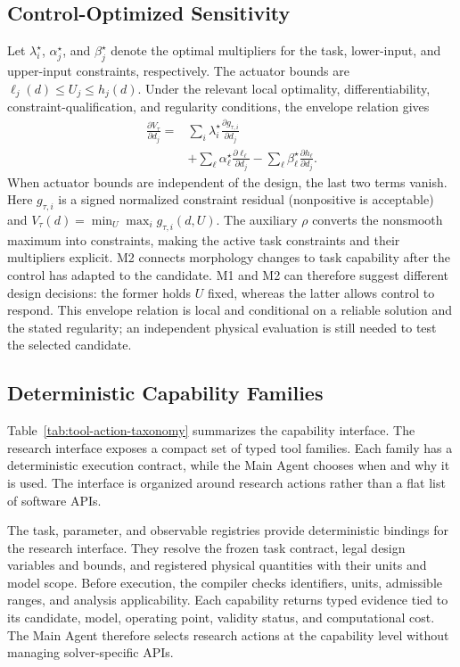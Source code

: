 \subsection{Control-Optimized Sensitivity}
Let $\lambda_i^\star$, $\alpha_j^\star$, and $\beta_j^\star$ denote the optimal multipliers for the task, lower-input, and upper-input constraints, respectively. The actuator bounds are $\ell_j(d)\leq U_j\leq h_j(d)$. Under the relevant local optimality, differentiability, constraint-qualification, and regularity conditions, the envelope relation gives
\begin{equation}
\begin{aligned}
\frac{\partial V_\tau}{\partial d_j}
={}&\sum_i\lambda_i^\star
\frac{\partial g_{\tau,i}}{\partial d_j}\\
&+\sum_\ell\alpha_\ell^\star
\frac{\partial \ell_\ell}{\partial d_j}
-\sum_\ell\beta_\ell^\star
\frac{\partial h_\ell}{\partial d_j}.
\end{aligned}
\label{eq:envelope-general}
\end{equation}
When actuator bounds are independent of the design, the last two terms vanish. Here $g_{\tau,i}$ is a signed normalized constraint residual (nonpositive is acceptable) and $V_\tau(d)=\min_U\max_i g_{\tau,i}(d,U)$. The auxiliary $\rho$ converts the nonsmooth maximum into constraints, making the active task constraints and their multipliers explicit. M2 connects morphology changes to task capability after the control has adapted to the candidate. M1 and M2 can therefore suggest different design decisions: the former holds $U$ fixed, whereas the latter allows control to respond. This envelope relation is local and conditional on a reliable solution and the stated regularity; an independent physical evaluation is still needed to test the selected candidate.


\subsection{Deterministic Capability Families}
\label{subsec:research-tools}

Table~\ref{tab:tool-action-taxonomy} summarizes the capability interface. The research interface exposes a compact set of typed tool families. Each family has a deterministic execution contract, while the Main Agent chooses when and why it is used. The interface is organized around research actions rather than a flat list of software APIs.



The task, parameter, and observable registries provide deterministic bindings for the research interface. They resolve the frozen task contract, legal design variables and bounds, and registered physical quantities with their units and model scope. Before execution, the compiler checks identifiers, units, admissible ranges, and analysis applicability. Each capability returns typed evidence tied to its candidate, model, operating point, validity status, and computational cost. The Main Agent therefore selects research actions at the capability level without managing solver-specific APIs.
